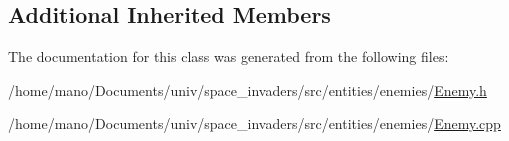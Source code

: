 \subsection*{Additional Inherited Members}


The documentation for this class was generated from the following files\+:\begin{DoxyCompactItemize}
\item 
/home/mano/\+Documents/univ/space\+\_\+invaders/src/entities/enemies/\hyperlink{Enemy_8h}{Enemy.\+h}\item 
/home/mano/\+Documents/univ/space\+\_\+invaders/src/entities/enemies/\hyperlink{Enemy_8cpp}{Enemy.\+cpp}\end{DoxyCompactItemize}
